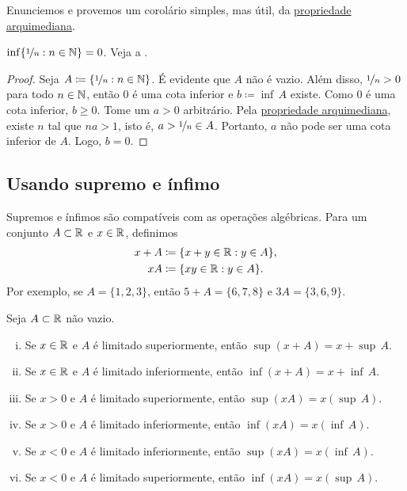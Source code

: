 Enunciemos e provemos um corolário simples, mas útil, da
\hyperref[thm:arch:i]{propriedade arquimediana}.

\begin{cor}
$\inf \{ \nicefrac{1}{n} : n \in {\mathbb{N}} \} = 0$.
Veja a .
\end{cor}

\begin{proof}
Seja $A \coloneqq \{ \nicefrac{1}{n} : n \in {\mathbb{N}} \}$. É evidente que $A$ não é vazio.
Além disso,
$\nicefrac{1}{n} > 0$ para todo $n \in {\mathbb{N}}$, então $0$ é uma cota inferior
e $b \coloneqq \inf\, A$ existe.
Como $0$ é uma cota inferior, $b \geq 0$.
Tome um $a > 0$ arbitrário. Pela
\hyperref[thm:arch:i]{propriedade arquimediana}, existe $n$ tal que
$na > 1$, isto é, $a > \nicefrac{1}{n} \in A$. Portanto,
$a$ não pode ser uma cota inferior de $A$. Logo, $b=0$.
\end{proof}

\begin{myfigureht}
\caption{O conjunto $\{ \nicefrac{1}{n} : n \in \N \}$ e seu ínfimo $0$.\label{fig:oneovernset}}
\end{myfigureht}



\subsection{Usando supremo e ínfimo}

Supremos e ínfimos são
compatíveis com as operações algébricas. Para um conjunto $A \subset {\mathbb{R}}$ e
$x \in {\mathbb{R}}$, definimos
\begin{align*}
x + A & \coloneqq \{ x+y \in {\mathbb{R}} : y \in A \} , \\
xA & \coloneqq \{ xy \in {\mathbb{R}} : y \in A \} .
\end{align*}
Por exemplo, se $A = \{ 1,2,3 \}$, então $5+A = \{ 6,7,8 \}$ e $3A = \{ 3,6,9
\}$.

\begin{prop} \label{prop:supinfalg}
Seja $A \subset {\mathbb{R}}$ não vazio.
\begin{enumerate}[(i)]
\item Se $x \in {\mathbb{R}}$ e $A$ é limitado superiormente, então $\sup (x+A) = x + \sup\, A$.
\item Se $x \in {\mathbb{R}}$ e $A$ é limitado inferiormente, então $\inf (x+A) = x + \inf\, A$.
\item Se $x > 0$ e $A$ é limitado superiormente, então $\sup (xA) = x ( \sup\, A )$.
\item Se $x > 0$ e $A$ é limitado inferiormente, então $\inf (xA) = x ( \inf\, A )$.
\item Se $x < 0$ e $A$ é limitado inferiormente, então $\sup (xA) = x ( \inf\, A )$.
\item Se $x < 0$ e $A$ é limitado superiormente, então $\inf (xA) = x ( \sup\, A )$.
\end{enumerate}
\end{prop}

